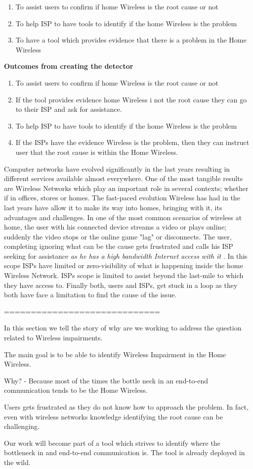 \begin{enumerate}
	\item To assist users to confirm if home Wireless is the root cause or not
	\item To help ISP to have tools to identify if the home Wireless is the problem
	\item To have a tool which provides evidence that there is a problem in the Home Wireless
\end{enumerate}

\textbf{Outcomes from creating the detector}

\begin{enumerate}
	\item To assist users to confirm if home Wireless is the root cause or not
	\item If the tool provides evidence home Wireless i not the root cause they can go to their ISP and ask for assistance.
	\item To help ISP to have tools to identify if the home Wireless is the problem
	\item If the ISPs have the evidence Wireless is the problem, then they can instruct user that the root cause is within the Home Wireless. \cite{WLAN_Troubleshooting}
\end{enumerate}


Computer networks have evolved significantly in the last years resulting in different services available almost everywhere. One of the most tangible results are Wireless Networks which play an important role in several contexts; whether if in offices, stores or homes. The fast-paced  evolution Wireless has had in the last years have allow it to make its way into homes, bringing with it, its advantages and challenges. In one of the most common scenarios of wireless at home, the user with his connected device streams a video or plays online; suddenly the video stops or the online game "lag" or disconnects. The user, completing ignoring what can be the cause gets frustrated and calls his ISP seeking for assistance \emph{as he has a high bandwidth Internet access with it} . In this scope ISPs have limited or zero-visibility of what is happening inside the home Wireless Network. ISPs scope is limited to assist beyond the last-mile to which they have access to. Finally both, users and ISPs, get stuck in a loop as they both have face a limitation to find the cause of the issue.

=============================

In this section we tell the story of why are we working to address the question related to Wireless impairments.

The main goal is to be able to identify Wireless Impairment in the Home Wireless.

Why? - Because most of the times the bottle neck in an end-to-end communication tends to be the Home Wireless.

Users gets frustrated as they do not know how to approach the problem. In fact, even with wireless networks knowledge identifying the root cause can be challenging.

Our work will become part of a tool which strives to identify where the bottleneck in and end-to-end communication is. The tool is already deployed in the wild.
